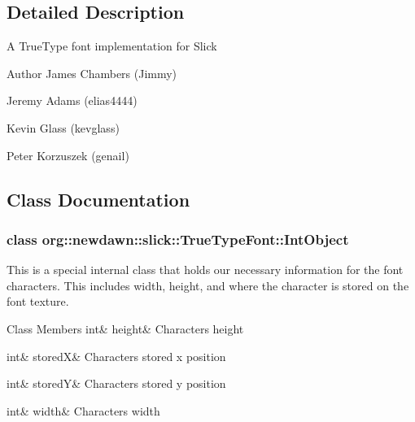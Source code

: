 \subsection{Detailed Description}
A True\+Type font implementation for Slick

\begin{DoxyAuthor}{Author}
James Chambers (Jimmy) 

Jeremy Adams (elias4444) 

Kevin Glass (kevglass) 

Peter Korzuszek (genail) 
\end{DoxyAuthor}


\subsection{Class Documentation}
\label{classorg_1_1newdawn_1_1slick_1_1_true_type_font_1_1_int_object}
\subsubsection{class org\+:\+:newdawn\+:\+:slick\+:\+:True\+Type\+Font\+:\+:Int\+Object}
This is a special internal class that holds our necessary information for the font characters. This includes width, height, and where the character is stored on the font texture. \begin{DoxyFields}{Class Members}
\mbox{\label{classorg_1_1newdawn_1_1slick_1_1_true_type_font_a40b6dc081892ad94432c12e43ec3a32f}} 
int&
height&
Character\textquotesingle{}s height \\
\hline

\mbox{\label{classorg_1_1newdawn_1_1slick_1_1_true_type_font_a13120f072d235e565fa6512353f09a65}} 
int&
storedX&
Character\textquotesingle{}s stored x position \\
\hline

\mbox{\label{classorg_1_1newdawn_1_1slick_1_1_true_type_font_a2e0689f86152e30cc1a0766162d2e263}} 
int&
storedY&
Character\textquotesingle{}s stored y position \\
\hline

\mbox{\label{classorg_1_1newdawn_1_1slick_1_1_true_type_font_a0145cf18e07aa4acde27296933dfb73b}} 
int&
width&
Character\textquotesingle{}s width \\
\hline

\end{DoxyFields}


